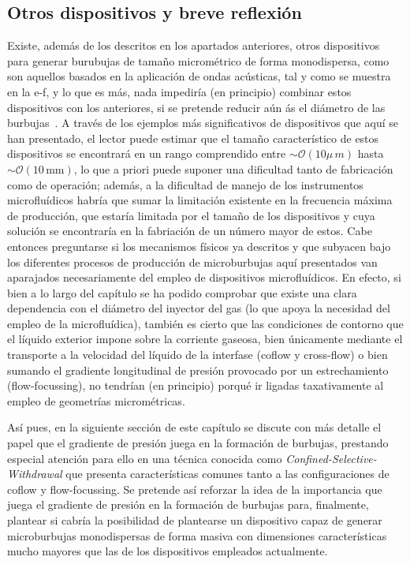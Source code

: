 \subsection{Otros dispositivos y breve reflexión}

Existe, además de los descritos en los apartados anteriores, otros dispositivos para generar burubujas de tamaño micrométrico de forma monodispersa, como son aquellos basados en la aplicación de ondas acústicas, tal y como se muestra en la e-f, y lo que es más, nada impediría (en principio) combinar estos dispositivos con los anteriores, si se pretende reducir aún ás el diámetro de las burbujas~\cite{Rodriguez-Rodriguez2015b}. A través de los ejemplos más significativos de dispositivos que aquí se han presentado, el lector puede estimar que el tamaño característico de estos dispositivos se encontrará en un rango comprendido entre $\sim \mathcal{O}(10 \mu\, m)$ hasta  $\sim \mathcal{O}\left(10 \,\mathrm{mm}\right)$, lo que a priori puede suponer una dificultad tanto de fabricación como de operación; además, a la dificultad de manejo de los instrumentos microfluídicos habría que sumar la limitación existente en la frecuencia máxima de producción, que estaría limitada por el tamaño de los dispositivos y cuya solución se encontraría en la fabriación de un número mayor de estos. Cabe entonces preguntarse si los mecanismos físicos ya descritos y que subyacen bajo los diferentes procesos de producción de microburbujas aquí presentados van aparajados necesariamente del empleo de dispositivos microfluídicos. En efecto, si bien a lo largo del capítulo se ha podido comprobar que existe una clara dependencia con el diámetro del inyector del gas (lo que apoya la necesidad del empleo de la microfluídica), también es cierto que las condiciones de contorno que el líquido exterior impone sobre la corriente gaseosa, bien únicamente mediante el transporte a la velocidad del líquido de la interfase (coflow y cross-flow) o bien sumando el gradiente longitudinal de presión provocado por un estrechamiento (flow-focussing), no tendrían (en principio) porqué ir ligadas taxativamente al empleo de geometrías micrométricas.  

Así pues, en la siguiente sección de este capítulo se discute con más detalle el papel que el gradiente de presión juega en la formación de burbujas, prestando especial atención para ello en una técnica conocida como \emph{Confined-Selective-Withdrawal} que presenta características comunes tanto a las configuraciones de coflow y flow-focussing. Se pretende así reforzar la idea de la importancia que juega el gradiente de presión en la formación de burbujas para, finalmente, plantear si cabría la posibilidad de plantearse un dispositivo capaz de generar microburbujas monodispersas de forma masiva con dimensiones características mucho mayores que las de los dispositivos empleados actualmente. 

